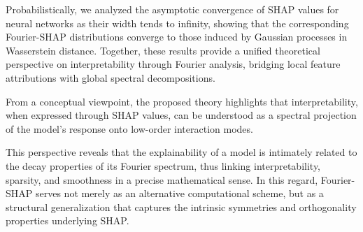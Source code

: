 \documentclass[letterpaper,11pt]{article}
\numberwithin{equation}{section}
\numberwithin{equation}{section}
\begin{document}
Probabilistically, we analyzed the asymptotic convergence of SHAP values for neural networks as their width tends to infinity, showing that the corresponding Fourier-SHAP distributions converge to those induced by Gaussian processes in Wasserstein distance. Together, these results provide a unified theoretical perspective on interpretability through Fourier analysis, bridging local feature attributions with global spectral decompositions.

From a conceptual viewpoint, the proposed theory highlights that interpretability, when expressed through SHAP values, can be understood as a spectral projection of the model's response onto low-order interaction modes. 

This perspective reveals that the explainability of a model is intimately related to the decay properties of its Fourier spectrum, thus linking interpretability, sparsity, and smoothness in a precise mathematical sense. In this regard, Fourier-SHAP serves not merely as an alternative computational scheme, but as a structural generalization that captures the intrinsic symmetries and orthogonality properties underlying SHAP.
\end{document}
